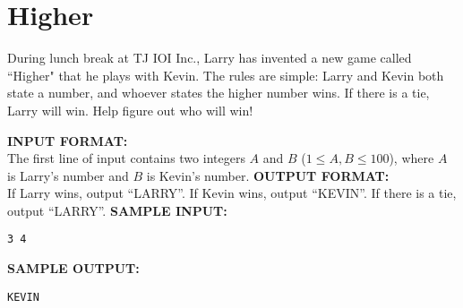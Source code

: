 \section{Higher}

During lunch break at TJ IOI Inc., Larry has invented a new game called ``Higher" that he plays with Kevin.  The rules are simple: Larry and Kevin both state a number, and whoever states the higher number wins.  If there is a tie, Larry will win. Help figure out who will win!

\blank
\textbf{INPUT FORMAT:}\\
The first line of input contains two integers $A$ and $B$ ($ 1 \leq A,B \leq 100 $), where $A$ is Larry's number and $B$ is Kevin's number.
\blank
\textbf{OUTPUT FORMAT:}\\
If Larry wins, output ``LARRY''. If Kevin wins, output ``KEVIN''. If there is a tie, output ``LARRY''.
\blank
\textbf{SAMPLE INPUT:}
\begin{verbatim}
3 4
\end{verbatim}
\textbf{SAMPLE OUTPUT:}
\begin{verbatim}
KEVIN
\end{verbatim}
